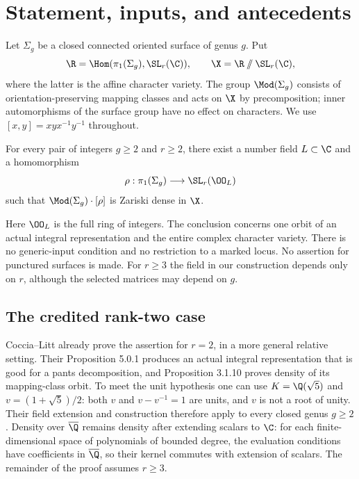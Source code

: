 \section{Statement, inputs, and antecedents}\label{sec:context}
Let $\Sigma_g$ be a closed connected oriented surface of genus $g$. Put
\[
 \R=\Hom(\pi_1(\Sigma_g),\SL_r(\C)),\qquad
 \X=\R\mathbin{/\!\!/}\SL_r(\C),
\]
where the latter is the affine character variety. The group $\Mod(\Sigma_g)$
consists of orientation-preserving mapping classes and acts on $\X$ by
precomposition; inner automorphisms of the surface group have no effect on
characters. We use $[x,y]=xyx^{-1}y^{-1}$ throughout.

\begin{theorem}\label{thm:main}
For every pair of integers $g\geq2$ and $r\geq2$, there exist a number field
$L\subset\C$ and a homomorphism
\[
 \rho:\pi_1(\Sigma_g)\longrightarrow\SL_r(\OO_L)
\]
such that $\Mod(\Sigma_g)\cdot[\rho]$ is Zariski dense in $\X$.
\end{theorem}

Here $\OO_L$ is the full ring of integers. The conclusion concerns one
orbit of an actual integral representation and the entire complex character
variety. There is no generic-input condition and no restriction to a marked
locus. No assertion for punctured surfaces is made. For $r\geq3$ the field
in our construction depends only on $r$, although the selected matrices may
depend on $g$.

\subsection{The credited rank-two case}
Coccia--Litt \cite[Propositions 3.1.10 and 5.0.1, Theorem 5.0.2]{CL}
already prove the assertion for $r=2$, in a more general relative setting.
Their Proposition 5.0.1 produces an actual integral representation that is
good for a pants decomposition, and Proposition 3.1.10 proves density of its
mapping-class orbit. To meet the unit hypothesis one can use
$K=\Q(\sqrt5)$ and $v=(1+\sqrt5)/2$: both $v$ and $v-v^{-1}=1$ are units,
and $v$ is not a root of unity. Their field extension and construction
therefore apply to every closed genus $g\geq2$. Density over $\overline\Q$
remains density after extending scalars to $\C$: for each finite-dimensional
space of polynomials of bounded degree, the evaluation conditions have
coefficients in $\overline\Q$, so their kernel commutes with extension of
scalars. The remainder of the proof assumes $r\geq3$.

